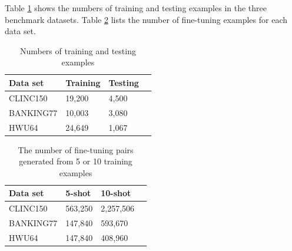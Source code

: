 \documentclass[sigconf, anonymous=true]{acmart}
\begin{document}
Table \ref{tab:NumTrainTest} shows the numbers of training and testing examples in the three benchmark datasets.
Table \ref{tab:NumFineTuning} lists the number of fine-tuning examples for each data set.

\begin{table}[H]
\setlength{} %
\footnotesize\centering
\begin{tabular}{llll}
\hline \textbf{Data set} & \textbf{Training} & \textbf{Testing} \\
\hline CLINC150 & 19,200 & 4,500  \\
BANKING77 & 10,003 & 3,080  \\
HWU64 & 24,649 & 1,067  \\
\hline
\end{tabular}
\caption{Numbers of training and testing examples}
\label{tab:NumTrainTest}
\end{table}

\begin{table}[H]
\setlength{} %
\footnotesize\centering
\begin{tabular}{llll}
\hline \textbf{Data set} & \textbf{5-shot} & \textbf{10-shot}\\
\hline CLINC150 & 563,250 & 2,257,506 \\
BANKING77 & 147,840 & 593,670  \\
HWU64 & 147,840 & 408,960  \\
\hline
\end{tabular}
\caption{The number of fine-tuning pairs generated from 5 or 10 training examples}
\label{tab:NumFineTuning}
\end{table}

\end{document}
